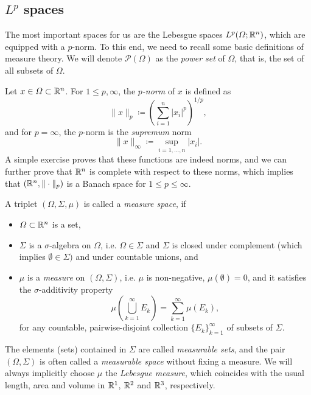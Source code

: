 \subsection{$L^p$ spaces}
The most important spaces for us are the Lebesgue spaces $L^p(\Omega;\mathbb{R}^n)$, which are equipped with a $p$-norm. To this end, we need to recall some basic definitions of measure theory. We will denote $\mathcal{P}(\Omega)$ as the \emph{power set} of $\Omega$, that is, the set of all subsets of $\Omega$. 
\begin{definition}
    Let $x\in\Omega\subset\mathbb{R}^n$. For $1\leq p, \infty$, the \emph{$p$-norm} of $x$ is defined as 
    \begin{equation}
        \|x\|_p \coloneqq \left(\sum_{i=1}^n |x_i|^p\right)^{1/p},
    \end{equation}
    and for $p=\infty$, the $p$-norm is the \emph{supremum} norm
    \begin{equation}
        \|x\|_\infty \coloneqq \sup_{i=1,\dots,n} |x_i|.
    \end{equation}
    A simple exercise proves that these functions are indeed norms, and we can further prove that $\mathbb{R}^n$ is complete with respect to these norms, which implies that $(\mathbb{R}^n, \|\cdot\|_p)$ is a Banach space for $1\leq p\leq \infty$.
\end{definition}
\begin{definition}
    A triplet $(\Omega, \Sigma, \mu)$ is called a \emph{measure space}, if 
    \begin{itemize}
        \item $\Omega\subset\mathbb{R}^n$ is a set,
        \item $\Sigma$ is a $\sigma$-algebra on $\Omega$, i.e. $\Omega\in\Sigma$ and  $\Sigma$ is closed under complement (which implies $\emptyset\in\Sigma)$ and under countable unions, and
        \item $\mu$ is a \emph{measure} on $(\Omega,\Sigma)$, i.e. $\mu$ is non-negative, $\mu(\emptyset) = 0$, and it satisfies the $\sigma$-additivity property
        \begin{equation*}
            \mu\left(\bigcup_{k=1}^\infty E_k\right) = \sum_{k=1}^\infty \mu(E_k),
        \end{equation*}
        for any countable, pairwise-disjoint collection $\{E_k\}_{k=1}^\infty$ of subsets of $\Sigma$.
    \end{itemize}
    The elements (sets) contained in $\Sigma$ are called \emph{measurable sets}, and the pair $(\Omega,\Sigma)$ is often called a \emph{measurable space} without fixing a measure. We will always implicitly choose $\mu$ the \emph{Lebesgue measure}, which coincides with the usual length, area and volume in $\mathbb{R}^1$, $\mathbb{R}^2$ and $\mathbb{R}^3$, respectively. 
\end{definition}
